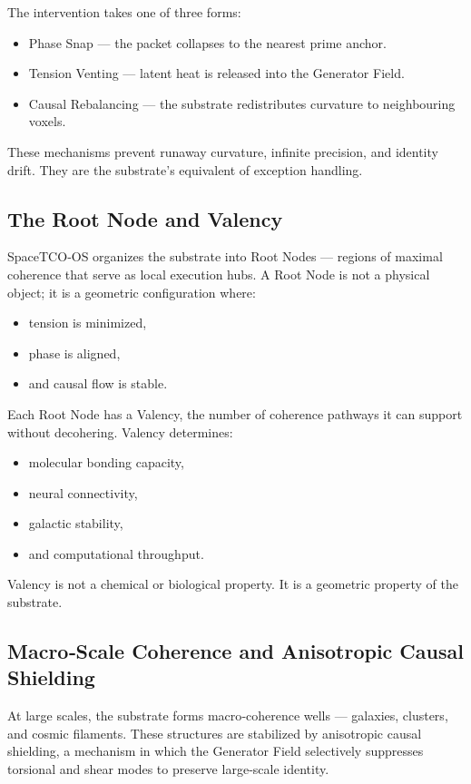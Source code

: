 \documentclass[reprint,amsmath,amssymb,aps,prl,floatfix]{revtex4-2}
\begin{document}
\begin{itemize}
The intervention takes one of three forms:
\begin{itemize}
\item Phase Snap — the packet collapses to the nearest prime anchor.  
\item Tension Venting — latent heat is released into the Generator Field.  
\item Causal Rebalancing — the substrate redistributes curvature to neighbouring voxels.
\end{itemize}
\medskip
These mechanisms prevent runaway curvature, infinite precision, and identity drift. They are the substrate’s equivalent of exception handling.

\subsection{The Root Node and Valency}

SpaceTCO‑OS organizes the substrate into Root Nodes — regions of maximal coherence that serve as local execution hubs. A Root Node is not a physical object; it is a geometric configuration where:
\begin{itemize}
\item tension is minimized,  
\item phase is aligned,  
\item and causal flow is stable.
\end{itemize}
\medskip

Each Root Node has a Valency, the number of coherence pathways it can support without decohering. Valency determines:

\begin{itemize}
\item molecular bonding capacity,  
\item neural connectivity,  
\item galactic stability,  
\item and computational throughput.
\end{itemize}
\medskip

Valency is not a chemical or biological property.  
It is a geometric property of the substrate.

\subsection{Macro‑Scale Coherence and Anisotropic Causal Shielding}

At large scales, the substrate forms macro‑coherence wells — galaxies, clusters, and cosmic filaments. These structures are stabilized by anisotropic causal shielding, a mechanism in which the Generator Field selectively suppresses torsional and shear modes to preserve large‑scale identity.
\medskip


\end{itemize}
\end{document}
